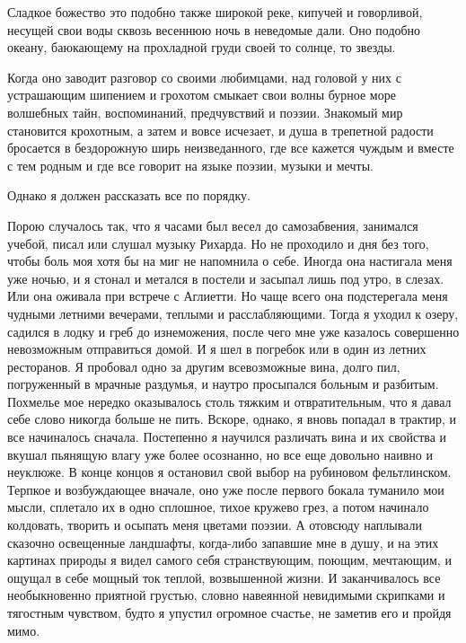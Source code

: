 Сладкое божество это подобно также широкой реке, кипучей и говорливой,
несущей свои воды  сквозь весеннюю ночь в неведомые  дали. Оно подобно
океану, баюкающему на прохладной груди своей то солнце, то звезды.

Когда оно  заводит разговор со своими  любимцами, над головой у  них с
устрашающим  шипением  и  грохотом  смыкает  свои  волны  бурное  море
волшебных  тайн, воспоминаний,  предчувствий  и  поэзии. Знакомый  мир
становится крохотным,  а затем  и вовсе исчезает,  и душа  в трепетной
радости бросается  в бездорожную  ширь неизведанного, где  все кажется
чуждым и вместе с тем родным и где все говорит на языке поэзии, музыки
и мечты.

Однако я должен рассказать все по порядку.

Порою случалось так, что я часами был весел до самозабвения, занимался
учебой, писал  или слушал музыку  Рихарда. Но  не проходило и  дня без
того, чтобы боль  моя хотя бы на  миг не напомнила о  себе. Иногда она
настигала меня  уже ночью, и  я стонал и  метался в постели  и засыпал
лишь под  утро, в слезах. Или  она оживала при встрече  с Аглиетти. Но
чаще всего она  подстерегала меня чудными летними  вечерами, теплыми и
расслабляющими. Тогда  я уходил  к озеру,  садился в  лодку и  греб до
изнеможения,  после  чего  мне  уже  казалось  совершенно  невозможным
отправиться домой. И я шел в погребок или в один из летних ресторанов.
Я пробовал одно за другим  всевозможные вина, долго пил, погруженный в
мрачные раздумья, и наутро просыпался больным и разбитым. Похмелье мое
нередко оказывалось  столь тяжким и  отвратительным, что я  давал себе
слово  никогда больше  не  пить.  Вскоре, однако,  я  вновь попадал  в
трактир,  и все  начиналось сначала.  Постепенно я  научился различать
вина и их свойства и вкушал пьянящую влагу уже более осознанно, но все
еще довольно наивно и неуклюже. В  конце концов я остановил свой выбор
на  рубиновом фельтлинском.  Терпкое и  возбуждающее вначале,  оно уже
после первого бокала туманило мои  мысли, сплетало их в одно сплошное,
тихое кружево грез, а потом начинало колдовать, творить и осыпать меня
цветами поэзии.  А отовсюду  наплывали сказочно  освещенные ландшафты,
когда-либо запавшие  мне в душу,  и на  этих картинах природы  я видел
самого себя странствующим,  поющим, мечтающим, и ощущал  в себе мощный
ток  теплой,  возвышенной  жизни. И  заканчивалось  все  необыкновенно
приятной грустью,  словно навеянной  невидимыми скрипками  и тягостным
чувством, будто  я упустил огромное  счастье, не заметив его  и пройдя
мимо.

